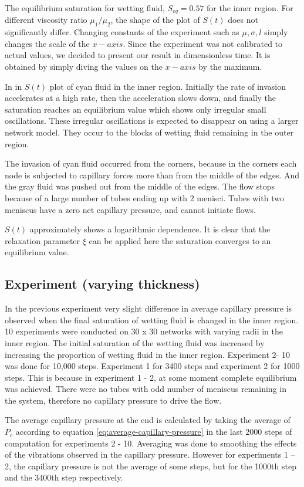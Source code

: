 	The equilibrium saturation for wetting fluid, $S_{eq} = 0.57$ for the inner region. For different viscosity ratio ${\mu}_1 / {\mu_2}$, the shape of the plot of $S(t)$ does not significantly differ. Changing constants of the experiment such as $\mu, \sigma, l$ simply changes the scale of the $x-axis$. Since the experiment was not calibrated to actual values, we decided to present our result in dimensionless time. It is obtained by simply diving the values on the $x-axis$ by the maximum.
	
	In in $S(t)$ plot of cyan fluid in the inner region. Initially the rate of invasion accelerates at a high rate, then the acceleration slows down, and finally the saturation reaches an equilibrium value which shows only irregular small oscillations. These irregular oscillations is expected to disappear on using a larger network model. They occur to the blocks of wetting fluid remaining in the outer region.
	
	The invasion of cyan fluid occurred from the corners, because in the corners each node is subjected to capillary forces more than from the middle of the edges. And the gray fluid was pushed out from the middle of the edges. The flow stops because of a large number of tubes ending up with 2 menisci. Tubes with two meniscus have a zero net capillary pressure, and cannot initiate flows. 
	
	$S(t)$ approximately shows a logarithmic dependence. It is clear that the relaxation parameter $\xi$ can be applied here the saturation converges to an equilibrium value.

\subsection{Experiment (varying thickness)}
	In the previous experiment very slight difference in average capillary pressure is observed when the final saturation of wetting fluid is changed in the inner region. 10 experiments were conducted on 30 x 30 networks with varying radii in the inner region. The initial saturation of the wetting fluid was increased by increasing the proportion of wetting fluid in the inner region. Experiment 2- 10 was done for 10,000 steps. Experiment 1 for 3400 steps and experiment 2 for 1000 steps. This is because in experiment 1 - 2, at some moment complete equilibrium was achieved. There were no tubes with odd number of meniscus remaining in the system, therefore no capillary pressure to drive the flow.
	
	The average capillary pressure at the end is calculated by taking the average of $P_c$ according to equation \ref{eq:average-capillary-pressure} in the last 2000 steps of computation for experiments 2 - 10. Averaging was done to smoothing the effects of the vibrations observed in the capillary pressure. However for experiments 1 – 2, the capillary pressure is not the average of some steps, but for the 1000th step and the 3400th step respectively.
	
